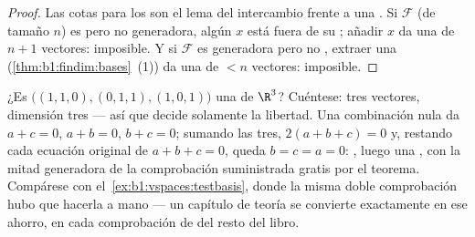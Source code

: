 \begin{proof}
Las cotas para los  son el lema del intercambio frente a
una . Si $\mathcal{F}$ (de tamaño $n$) es  pero no
generadora, algún $x$ está fuera de su ; añadir
$x$ da una  de $n + 1$ vectores: imposible. Y si
$\mathcal{F}$ es generadora pero no , extraer una 
(\cref{thm:b1:findim:bases}~(1)) da una  de $< n$ vectores:
imposible.
\end{proof}

\begin{example}
\label{ex:b1:findim:twoofthreerun}
¿Es $\bigl((1,1,0), (0,1,1), (1,0,1)\bigr)$ una  de $\R^3$?
Cuéntese: tres vectores, dimensión tres --- así que decide solamente
la libertad. Una combinación nula da $a + c = 0$, $a + b = 0$,
$b + c = 0$; sumando las tres, $2(a + b + c) = 0$ y, restando cada
ecuación original de $a + b + c = 0$, queda $b = c = a = 0$: ,
luego una , con la mitad generadora de la comprobación
suministrada gratis por el teorema. Compárese con
el~\cref{ex:b1:vspaces:testbasis}, donde la misma doble comprobación
hubo que hacerla a mano --- un capítulo de teoría se convierte
exactamente en ese ahorro, en cada comprobación de  del resto
del libro.
\end{example}


